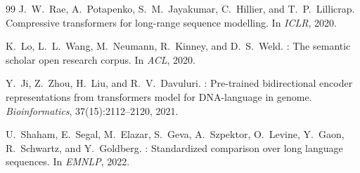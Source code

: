 \begin{thebibliography}{99}
J.~W.~Rae, A.~Potapenko, S.~M.~Jayakumar, C.~Hillier, and T.~P.~Lillicrap.
\newblock Compressive transformers for long-range sequence modelling.
\newblock In \textit{ICLR}, 2020.

K.~Lo, L.~L.~Wang, M.~Neumann, R.~Kinney, and D.~S.~Weld.
: The semantic scholar open research corpus.
\newblock In \textit{ACL}, 2020.

Y.~Ji, Z.~Zhou, H.~Liu, and R.~V.~Davuluri.
: Pre-trained bidirectional encoder representations from
transformers model for {DNA}-language in genome.
\newblock \textit{Bioinformatics}, 37(15):2112--2120, 2021.

U.~Shaham, E.~Segal, M.~Elazar, S.~Geva, A.~Szpektor, O.~Levine,
Y.~Gaon, R.~Schwartz, and Y.~Goldberg.
: Standardized comparison over long language sequences.
\newblock In \textit{EMNLP}, 2022.

\end{thebibliography}
\endgroup
